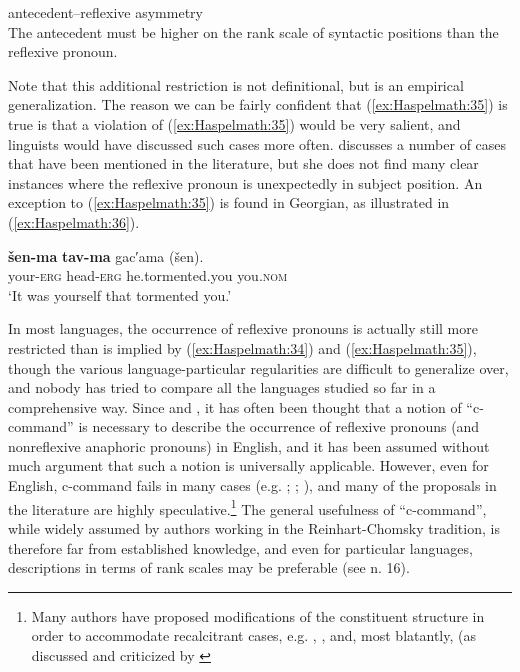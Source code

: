 \documentclass[output=paper]{langscibook}
\begin{document}
\ea%
    antecedent–reflexive asymmetry\label{ex:Haspelmath:35}\\
   The antecedent must be higher on the rank scale of syntactic positions than the reflexive pronoun.
\z

Note that this additional restriction is not definitional, but is an empirical generalization. The reason we can be fairly confident that (\ref{ex:Haspelmath:35}) is true is that a violation of (\ref{ex:Haspelmath:35}) would be very salient, and linguists would have discussed such cases more often. \citet{Forker2014} discusses a number of cases that have been mentioned in the literature, but she does not find many clear instances where the reflexive pronoun is unexpectedly in subject position. An exception to (\ref{ex:Haspelmath:35}) is found in Georgian, as illustrated in (\ref{ex:Haspelmath:36}).

\ea%
    \label{ex:Haspelmath:36}
    \gll  \textbf{{šen-ma}}  \textbf{{tav-ma}}  {gac′ama}    {(šen).} \\
     {your-\textsc{erg}}  {head-\textsc{erg}}   {he.tormented.you}  {you.\textsc{nom}} \\
    \glt‘It was yourself that tormented you.’ \citep{Amiridze2003}
\z

In most languages, the occurrence of reflexive pronouns is actually still more restricted than is implied by (\ref{ex:Haspelmath:34}) and (\ref{ex:Haspelmath:35}), though the various language-particular regularities are difficult to generalize over, and nobody has tried to compare all the languages studied so far in a comprehensive way. Since \citet{Chomsky1981} and \citet{Reinhart1983a}, it has often been thought that a notion of “c-command” is necessary to describe the occurrence of reflexive pronouns (and nonreflexive anaphoric pronouns) in English, and it has been assumed without much argument that such a notion is universally applicable. However, even for English, c-command fails in many cases (e.g. \citealt{BarssLasnik1986}; \citealt{Pesetsky1987}; \citealt{Bruening2014}), and many of the proposals in the literature are highly speculative.\footnote{ {Many authors have proposed modifications of the constituent structure in order to accommodate recalcitrant cases, e.g. \citet[81]{Reinhart1983b}, \citet{Pesetsky1987}, and, most blatantly, \citet{Larson1988} (as discussed and criticized by \citealt[\S2.1.3]{CulicoverJackendoff2005}}} The general usefulness of “c-command”, while widely assumed by authors working in the Reinhart-Chomsky tradition, is therefore far from established knowledge, and even for particular languages, descriptions in terms of rank scales may be preferable (see n. 16).
\end{document}
